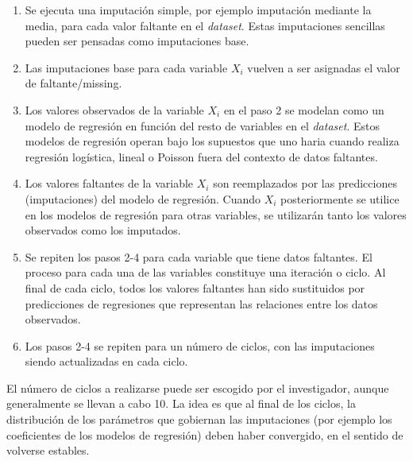 \documentclass[
  11pt,
  a4paper,
]{article}
\begin{document}
\begin{enumerate}
\item Se ejecuta una imputación simple, por ejemplo imputación mediante la media, para cada valor faltante en el \emph{dataset}. Estas imputaciones sencillas pueden ser pensadas como imputaciones base. 
\item Las imputaciones base para cada variable $X_i$ vuelven a ser asignadas el valor de faltante/missing.
\item Los valores observados de la variable $X_i$ en el paso 2 se modelan como un modelo de regresión en función del resto de variables en el \emph{dataset}. Estos modelos de regresión operan bajo los supuestos que uno haria cuando realiza regresión logística, lineal o Poisson fuera del contexto de datos faltantes.
\item Los valores faltantes de la variable $X_i$ son reemplazados por las predicciones (imputaciones) del modelo de regresión. Cuando $X_i$ posteriormente se utilice en los modelos de regresión para otras variables, se utilizarán tanto los valores observados como los imputados.
\item Se repiten los pasos 2-4 para cada variable que tiene datos faltantes. El proceso para cada una de las variables constituye una iteración o ciclo. Al final de cada ciclo, todos los valores faltantes han sido sustituidos por predicciones de regresiones que representan las relaciones entre los datos observados. 
\item Los pasos 2-4 se repiten para un número de ciclos, con las imputaciones siendo actualizadas en cada ciclo.
\end{enumerate}

El número de ciclos a realizarse puede ser escogido por el investigador,
aunque generalmente se llevan a cabo 10. La idea es que al final de los
ciclos, la distribución de los parámetros que gobiernan las imputaciones
(por ejemplo los coeficientes de los modelos de regresión) deben haber
convergido, en el sentido de volverse estables.
\end{document}
